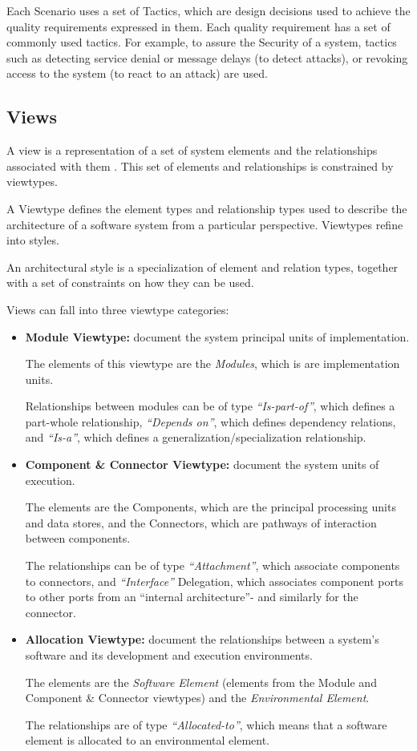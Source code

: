 Each Scenario uses a set of Tactics, which are design decisions used to achieve the quality requirements expressed in them. Each quality requirement has a set of commonly used tactics. For example, to assure the Security of a system, tactics such as detecting service denial or message delays (to detect attacks), or revoking access to the system (to react to an attack) are used.

\subsection{Views}
A view is a representation of a set of system elements and the relationships associated with them \cite{clements2003documenting}. This set of elements and relationships is constrained by viewtypes.

A Viewtype defines the element types and relationship types used to describe the architecture of a software system from a particular perspective. Viewtypes refine into styles.

An architectural style is a specialization of element and relation types, together with a set of constraints on how they can be used.

Views can fall into three viewtype categories:
\begin{itemize}
\item \textbf{Module Viewtype:} document the system principal units of implementation. 

The elements of this viewtype are the \textit{Modules}, which is are implementation units. 

Relationships between modules can be of type \textit{``Is-part-of''}, which defines a part-whole relationship, \textit{``Depends on''}, which defines dependency relations, and \textit{``Is-a''}, which defines a generalization/specialization relationship.

\item \textbf{Component \& Connector Viewtype:} document the system units of execution. 

The elements are the Components, which are the principal processing units and data stores, and the Connectors, which are pathways of interaction between components. 

The relationships can be of type \textit{``Attachment''}, which associate components to connectors, and \textit{``Interface''} Delegation, which associates component ports to other ports from an ``internal architecture''- and similarly for the connector.

\item \textbf{Allocation Viewtype:} document the relationships between a system's software and its development and execution environments. 

The elements are the \textit{Software Element} (elements from the Module and Component \& Connector viewtypes) and the \textit{Environmental Element}. 

The relationships are of type \textit{``Allocated-to''}, which means that a software element is allocated to an environmental element. 
\end{itemize}

